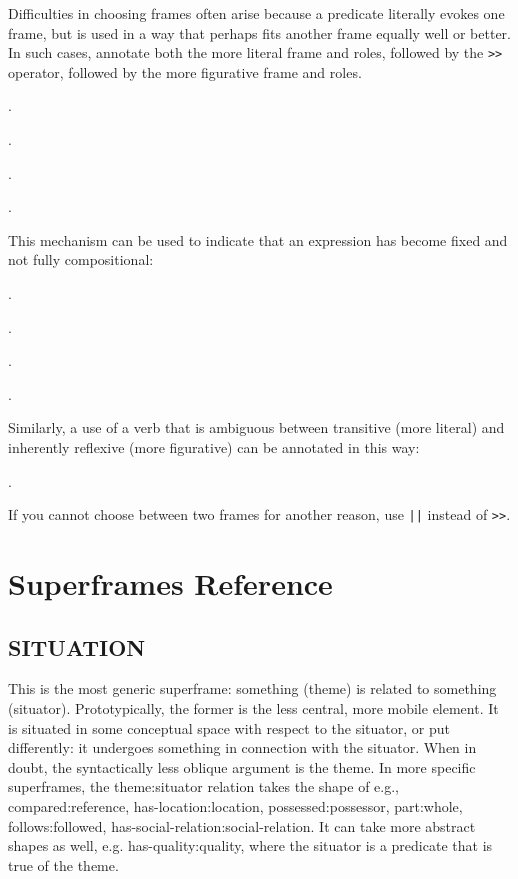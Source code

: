 \documentclass[a4paper]{article}
\newcommand{\fr}[1]{\textsf{#1}}
\newcommand{\rl}[1]{\textsf{#1}}
\begin{document}
Difficulties in choosing frames often arise because a predicate literally evokes
one frame, but is used in a way that perhaps fits another frame equally well or
better. In such cases, annotate both the more literal frame and roles, followed
by the \texttt{>}\texttt{>} operator, followed by the more figurative frame and
roles.

\ex.

\ex.

\ex.

\ex.

This mechanism can be used to indicate that an expression has become fixed and
not fully compositional:

\ex.

\ex.

\ex.

\ex.

Similarly, a use of a verb that is ambiguous between transitive (more literal)
and inherently reflexive (more figurative) can be annotated in this way:

\ex.

If you cannot choose between two frames for another reason, use \texttt{||} instead of \texttt{>}\texttt{>}.


\newpage\section{Superframes Reference}

\subsection{ \fr{SITUATION}}
\label{sec:SITUATION}

This is the most generic superframe: something (\rl{theme}) is related to
something (\rl{situator}). Prototypically, the former is the less central, more
mobile element. It is situated in some conceptual space with respect to the
situator, or put differently: it undergoes something in connection with the
situator. When in doubt, the syntactically less oblique argument is the
theme. In more specific superframes, the theme:situator relation takes
the shape of e.g., compared:reference, has-location:location,
possessed:possessor, part:whole, follows:followed,
has-social-relation:social-relation. It can take more abstract shapes as well,
e.g. has-quality:quality, where the situator is a predicate that is true of the
theme.
\end{document}
